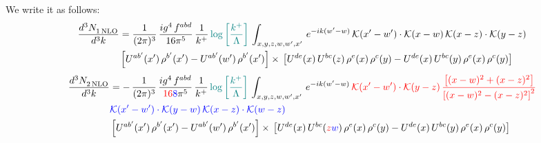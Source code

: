 \documentclass[9pt]{article}
\numberwithin{equation}{section}
\begin{document}
We write it as follows: 
\begin{align}
   \frac{d^{3}N_{1\,\rm NLO}^{\rm}}{d^{3}k}  & = \frac{1}{(2\pi)^{3}}\,\frac{ig^{4}\,f^{abd}}{16\pi^{5}}\,\frac{1}{k^{+}}\,{\color{teal}\log{\left[\frac{k^{+}}{\Lambda}\right]}}\,\int_{x,y,z,w,w',x'}\,e^{-ik(w^\prime-w)}\, \mathcal{K}(x'-w')\cdot \mathcal{K}(x-w)\, \mathcal{K}(x-z)\cdot \mathcal{K}(y-z) \notag \\ & \left[U^{ab'}(x')\,\rho^{b'}(x')-U^{ab'}(w')\, \rho^{b'}(x')\right]\times\, \left[U^{de}(x)\,U^{bc}(z)\, \rho^{e}(x)\,\rho^{c}(y)-U^{de}(x)\,U^{bc}(y)\,\rho^{e}(x)\,\rho^{c}(y)\right]
\end{align}
\begin{align}
   \frac{d^{3}N_{2\,\rm NLO}^{\rm}}{d^{3}k}  & = -\,\frac{1}{(2\pi)^{3}}\, \frac{ig^{4}\, f^{abd}}{{\color{red}16}{\color{blue}8}\pi^{5}}\, \frac{1}{k^{+}}\,{\color{teal}\log{\left[\frac{k^{+}}{\Lambda}\right]}}\,\int_{x,y,z,w,w',x'}\,e^{-ik(w^\prime-w)}\, {\color{red}\mathcal{K}(x'-w')\cdot \mathcal{K}(y-z)\, \frac{\left[(x-w)^{2}+(x-z)^{2}\right]}{\left[(x-w)^{2}-(x-z)^{2}\right]^{2}}}\notag \\ & {\color{blue}\mathcal{K}(x'-w')\cdot \mathcal{K}(y-w)\, \mathcal{K}(x-z)\cdot \mathcal{K}(w-z)} \notag \\ & \left[U^{ab'}(x')\,\rho^{b'}(x')-U^{ab'}(w')\, \rho^{b'}(x')\right]\times\,\left[U^{de}(x)\,U^{bc}({\color{red}z}{\color{blue}w})\, \rho^{e}(x)\,\rho^{c}(y)-U^{de}(x)\,U^{bc}(y)\,\rho^{e}(x)\,\rho^{c}(y)\right] 
\end{align}
\end{document}
